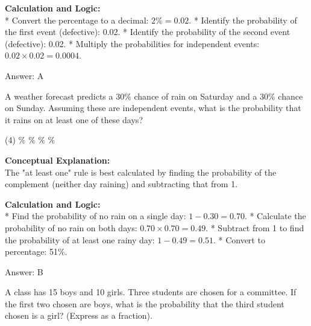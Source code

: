 \documentclass[11pt,paper=a4,answers]{exam}
\begin{document}
\begin{questions}
\begin{solution}
\vspace{30pt}

\textbf{Calculation and Logic:} \\
* Convert the percentage to a decimal: $2\% = 0.02$.
* Identify the probability of the first event (defective): 0.02.
* Identify the probability of the second event (defective): 0.02.
* Multiply the probabilities for independent events: $0.02 \times 0.02 = 0.0004$.

\vspace{30pt}

Answer: \colorbox{yellow!100}{A}
\end{solution}

\vspace{60pt}

\question
A weather forecast predicts a 30\% chance of rain on Saturday and a 30\% chance on Sunday. Assuming these are independent events, what is the probability that it rains on at least one of these days?
\begin{tasks}(4)
    \%
    \%
    \%
    \%
\end{tasks}

\begin{solution}
\textbf{Conceptual Explanation:} \\
The "at least one" rule is best calculated by finding the probability of the complement (neither day raining) and subtracting that from 1.

\vspace{30pt}

\textbf{Calculation and Logic:} \\
* Find the probability of no rain on a single day: $1 - 0.30 = 0.70$.
* Calculate the probability of no rain on both days: $0.70 \times 0.70 = 0.49$.
* Subtract from 1 to find the probability of at least one rainy day: $1 - 0.49 = 0.51$.
* Convert to percentage: 51\%.

\vspace{30pt}

Answer: \colorbox{yellow!100}{B}
\end{solution}

\vspace{60pt}

\question
A class has 15 boys and 10 girls. Three students are chosen for a committee. If the first two chosen are boys, what is the probability that the third student chosen is a girl? (Express as a fraction).


\end{questions}
\end{document}
